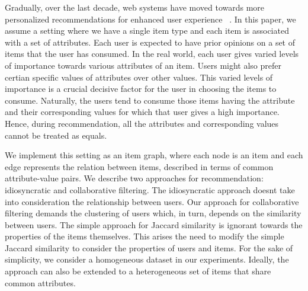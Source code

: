 \documentclass{acm_proc_article-sp}
\begin{document}
Gradually, over the last decade, web systems have moved towards more personalized recommendations for enhanced user experience ~\cite{durao, fabian}. In this paper, we assume a setting where we have a single item type and each item is associated with a set of attributes. Each user is expected to have prior opinions on a set of items that the user has consumed. In the real world, each user gives varied levels of importance towards various attributes of an item. Users might also prefer certian specific values of attributes over other values. This varied levels of importance is a crucial decisive factor for the user in choosing the items to consume. Naturally, the users tend to consume those items having the attribute and their corresponding values for which that user gives a high importance. Hence, during recommendation, all the attributes and corresponding values cannot be treated as equals.

We implement this setting as an item graph, where each node is an item and each edge represents the relation between items, described in terms of common attribute-value pairs. We describe two approaches for recommendation: idiosyncratic and collaborative filtering. The idiosyncratic approach doesnt take into consideration the relationship between users. Our approach for collaborative filtering demands the clustering of users which, in turn, depends on the similarity between users. The simple approach for Jaccard similarity is ignorant towards the properties of the items themselves. This arises the need to modify the simple Jaccard similarity to consider the properties of users and items. For the sake of simplicity, we consider a homogeneous dataset in our experiments. Ideally, the approach can also be extended to a heterogeneous set of items that share common attributes.




\end{document}

